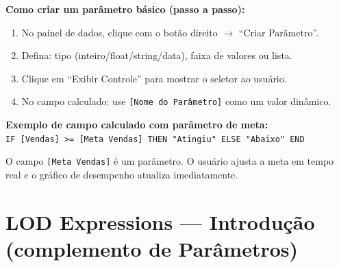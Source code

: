\begin{SolvedBox}
\textbf{Como criar um parâmetro básico (passo a passo):}

\begin{enumerate}
  \item No painel de dados, clique com o botão direito $\to$ ``Criar Parâmetro''.
  \item Defina: tipo (inteiro/float/string/data), faixa de valores ou lista.
  \item Clique em ``Exibir Controle'' para mostrar o seletor ao usuário.
  \item No campo calculado: use \texttt{[Nome do Parâmetro]} como um valor dinâmico.
\end{enumerate}

\textbf{Exemplo de campo calculado com parâmetro de meta:}\\
\texttt{IF [Vendas] >= [Meta Vendas] THEN "Atingiu" ELSE "Abaixo" END}

O campo \texttt{[Meta Vendas]} é um parâmetro. O usuário ajusta a meta em
tempo real e o gráfico de desempenho atualiza imediatamente.
\end{SolvedBox}

\section{LOD Expressions — Introdução (complemento de Parâmetros)}

